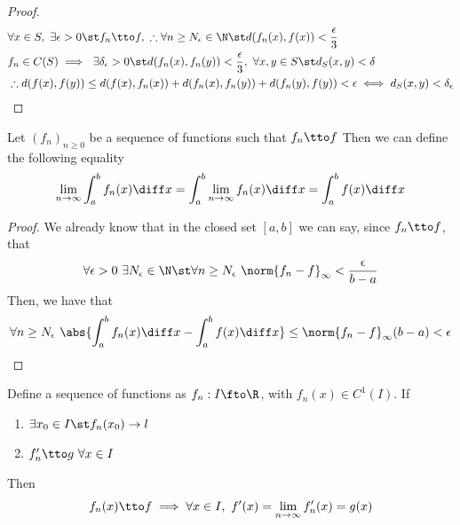\documentclass[../mmf.tex]{subfiles}
\begin{document}
\begin{proof}
	\begin{equation}
		\begin{aligned}
			&\forall x\in S,\ \exists\epsilon>0\st f_n\tto f,\ \therefore\forall n\ge N_\epsilon\in\N\st d(f_n(x),f(x))<\frac{\epsilon}{3}\\
			&f_n\in C(S)\implies{}\ \exists\delta_\epsilon>0\st d(f_n(x),f_n(y))<\frac{\epsilon}{3},\ \forall x,y\in S\st d_S(x,y)<\delta\\
			&\therefore d(f(x),f(y))\le d(f(x),f_n(x))+d(f_n(x),f_n(y))+d(f_n(y),f(y))<\epsilon\iff d_S(x,y)<\delta_\epsilon
		\end{aligned}
		\label{eq:proofustopwc}
	\end{equation}
\end{proof}
\begin{thm}
	Let $(f_n)_{n\ge0}$ be a sequence of functions such that $f_n\tto f$
	Then we can define the following equality
	\begin{equation}
		\lim_{n\to\infty}\int_a^bf_n(x)\diff x=\int_a^b\lim_{n\to\infty}f_n(x)\diff x=\int_a^bf(x)\diff x
		\label{eq:seqint}
	\end{equation}
\end{thm}
\begin{proof}
	We already know that in the closed set $[a,b]$ we can say, since $f_n\tto f$, that
	\begin{equation}
		\forall\epsilon>0\ \exists N_\epsilon\in\N\st\forall n\ge N_\epsilon\ \norm{f_n-f}_{\infty}<\frac{\epsilon}{b-a}
		\label{eq:seqint1}
	\end{equation}
	Then, we have that
	\begin{equation}
		\forall n\ge N_\epsilon\ \abs{\int_{a}^{b}f_n(x)\diff x-\int_{a}^{b}f(x)\diff x}\le\norm{f_n-f}_\infty(b-a)<\epsilon
		\label{eq:seqint2}
	\end{equation}
\end{proof}
\begin{thm}
	Define a sequence of functions as $f_n:I\fto\R$, with $f_n(x)\in C^1(I)$. If
	\begin{enumerate}
	\item $\exists x_0\in I\st f_n(x_0)\to l$
	\item $f_n'\tto g\ \forall x\in I$
	\end{enumerate}
	Then
	\begin{equation}
		f_n(x)\tto f\implies{}\forall x\in I,\ f'(x)=\lim_{n\to\infty}f_n'(x)=g(x)
		\label{eq:seqder1}
	\end{equation}
\end{thm}
\end{document}
